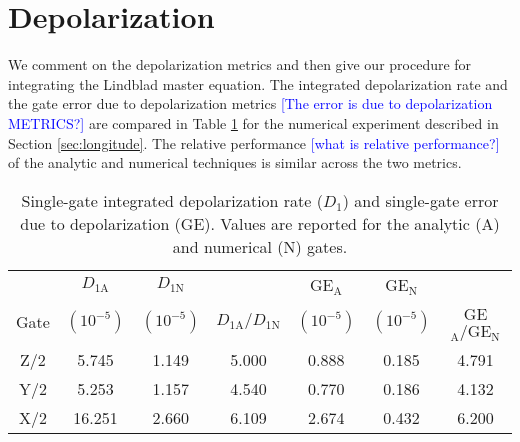 \section{Depolarization \label{appendix:longitude}}
We comment on the depolarization metrics and then give
our procedure for integrating the Lindblad master equation.
The integrated depolarization rate and the gate error due to
depolarization metrics \textcolor{blue}{[The error is due to depolarization METRICS?]} are compared in Table \ref{tab:longitude} for the
numerical experiment described in Section \ref{sec:longitude}.
The relative performance \textcolor{blue}{[what is relative performance?]} of the analytic and numerical techniques
is similar across the two metrics.

\begin{table}[ht]
  \begin{tabular}{c | c | c | c | c | c | c}
         & $D_{1\textrm{A}}$ & $D_{1\textrm{N}}$ & & GE$_{\textrm{A}}$ & GE$_{\textrm{N}}$ &\\
    Gate & $(10^{-5})$ & $(10^{-5})$ & $D_{1\textrm{A}}/ D_{1\textrm{N}}$ & $(10^{-5})$ &
    $(10^{-5})$ & GE$_{\textrm{A}} / \textrm{GE}_{\textrm{N}}$\\
    \hline
    Z/2 & 5.745 & 1.149 & 5.000 & 0.888   & 0.185  & 4.791 \\
    Y/2 & 5.253 & 1.157 & 4.540 & 0.770 & 0.186   & 4.132\\
    X/2 & 16.251 & 2.660 & 6.109 & 2.674 & 0.432  & 6.200\\
  \end{tabular}
  \caption{
    Single-gate integrated depolarization rate ($D_{1}$)
    and single-gate error due to depolarization (GE).
    Values are reported for the analytic (A) and numerical (N) gates.
  }
  \label{tab:longitude}
\end{table}

